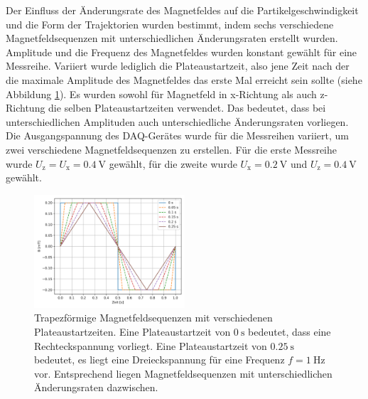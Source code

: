 \documentclass[page,pdftex,12pt,a4paper,twoside,openright]{scrbook}
\begin{document}
Der Einfluss der Änderungsrate des Magnetfeldes auf die Partikelgeschwindigkeit und die Form der Trajektorien wurden bestimmt, indem sechs verschiedene Magnetfeldsequenzen mit unterschiedlichen Änderungsraten erstellt wurden. Amplitude und die Frequenz des Magnetfeldes wurden konstant gewählt für eine Messreihe. Variiert wurde lediglich die Plateaustartzeit, also jene Zeit nach der die maximale Amplitude des Magnetfeldes das erste Mal erreicht sein sollte (siehe Abbildung \ref{fig-plateau}). Es wurden sowohl für Magnetfeld in x-Richtung als auch z-Richtung die selben Plateaustartzeiten verwendet. Das bedeutet, dass bei unterschiedlichen Amplituden auch unterschiedliche Änderungsraten vorliegen. Die Ausgangspannung des DAQ-Gerätes wurde für die Messreihen variiert, um zwei verschiedene Magnetfeldsequenzen zu erstellen. Für die erste Messreihe wurde \(U_\mathrm{z} = U_\mathrm{x} = \SI{0.4}{\volt}\) gewählt, für die zweite wurde \(U_\mathrm{x} = \SI{0.2}{\volt}\) und  \(U_\mathrm{z} = \SI{0.4}{\volt}\) gewählt.\\

\begin{figure}[h]
\centering
\includegraphics[width=0.5\textwidth]{./img/plateau.png}
\caption{\label{fig-plateau}
Trapezförmige Magnetfeldsequenzen mit verschiedenen Plateaustartzeiten. Eine Plateaustartzeit von \(\SI{0}{\s}\) bedeutet, dass eine Rechteckspannung vorliegt. Eine Plateaustartzeit von \(\SI{0.25}{\s}\) bedeutet, es liegt eine Dreieckspannung für eine Frequenz \(f = \SI{1}{\hertz}\) vor. Entsprechend liegen Magnetfeldsequenzen mit unterschiedlichen Änderungsraten dazwischen.}
\end{figure}
\end{document}
